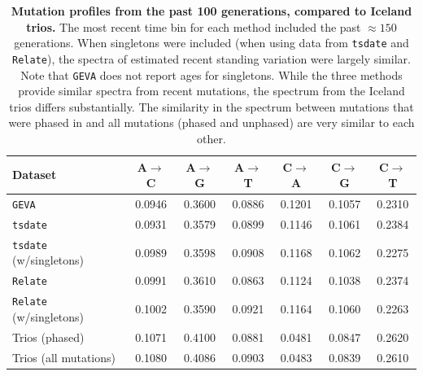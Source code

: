 \documentclass[]{article}
\begin{document}
\begin{table}[h]
    \caption{
        \label{tab:recent-spectra}
        \textbf{Mutation profiles from the past 100 generations,
        compared to Iceland trios.}
        The most recent time bin for each method included the past $\approx150$
        generations. When singletons were included (when using data from
        \texttt{tsdate} and \texttt{Relate}), the spectra of estimated
        recent standing variation were largely similar. Note that \texttt{GEVA}
        does not report ages for singletons.
        While the three methods provide similar spectra from recent mutations,
        the spectrum from the Iceland trios differs substantially.
        The similarity in the spectrum between mutations that were phased
        in \citet{jonsson2017parental} and all mutations (phased and unphased)
        are very similar to each other.
    }
    \centering
    \begin{tabular}[t]{l|cccccc}
        \toprule
        Dataset & A$\rightarrow$C & A$\rightarrow$G & A$\rightarrow$T &
            C$\rightarrow$A & C$\rightarrow$G & C$\rightarrow$T \\
        \midrule
        \texttt{GEVA} & 0.0946 & 0.3600 & 0.0886 & 0.1201 & 0.1057 & 0.2310 \\
        \texttt{tsdate} & 0.0931 & 0.3579 & 0.0899 & 0.1146 & 0.1061 & 0.2384 \\
        \texttt{tsdate} (w/singletons) & 0.0989 & 0.3598 & 0.0908 & 0.1168 & 0.1062 & 0.2275 \\
        \texttt{Relate} & 0.0991 & 0.3610 & 0.0863 & 0.1124 & 0.1038 & 0.2374 \\
        \texttt{Relate} (w/singletons) & 0.1002 & 0.3590 & 0.0921 & 0.1164 & 0.1060 & 0.2263 \\
        \midrule
        Trios (phased) & 0.1071 & 0.4100 & 0.0881 & 0.0481 & 0.0847 & 0.2620 \\
        Trios (all mutations) & 0.1080 & 0.4086 & 0.0903 & 0.0483 & 0.0839 & 0.2610 \\
        \bottomrule
    \end{tabular}
\end{table}

\clearpage



\end{document}
